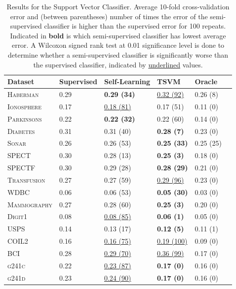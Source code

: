 \documentclass[twoside]{memoir}\usepackage[]{graphicx}\usepackage{xcolor}
\begin{document}
\begin{table}[t]
\caption{Results for the Support Vector Classifier. Average 10-fold cross-validation error and (between parentheses) number of times the error of the semi-supervised classifier is higher than the supervised error for 100 repeats. Indicated in \textbf{bold} is which semi-supervised classifier has lowest average error. A Wilcoxon signed rank test at 0.01 significance level is done to determine whether a semi-supervised classifier is significantly worse than the supervised classifier, indicated by \underline{underlined} values.} \label{table:cvresults-svm}
\centering
\begin{tabular}{llllll}
\toprule
Dataset & Supervised & Self-Learning & TSVM & Oracle \\ 
  \midrule
\textsc{Haberman} & 0.29 & \textbf{0.29 (34)} & \underline{0.32 (92)} & 0.26 (8) \\ 
  \textsc{Ionosphere} & 0.17 & \underline{0.18 (81)} & 0.17 (51) & 0.11 (0) \\ 
  \textsc{Parkinsons} & 0.22 & \textbf{0.22 (32)} & 0.22 (60) & 0.14 (0) \\ 
  \textsc{Diabetes} & 0.31 & 0.31 (40) & \textbf{0.28 (7)} & 0.23 (0) \\ 
  \textsc{Sonar} & 0.26 & 0.26 (53) & \textbf{0.25 (33)} & 0.25 (25) \\ 
  \textsc{SPECT} & 0.30 & 0.28 (13) & \textbf{0.25 (3)} & 0.18 (0) \\ 
  \textsc{SPECTF} & 0.30 & 0.29 (28) & \textbf{0.28 (29)} & 0.21 (0) \\ 
  \textsc{Transfusion} & 0.27 & 0.27 (59) & \underline{0.29 (96)} & 0.23 (0) \\ 
  \textsc{WDBC} & 0.06 & 0.06 (53) & \textbf{0.05 (30)} & 0.03 (0) \\ 
  \textsc{Mammography} & 0.27 & 0.28 (60) & \textbf{0.25 (3)} & 0.20 (0) \\ 
  \textsc{Digit1} & 0.08 & \underline{0.08 (85)} & \textbf{0.06 (1)} & 0.05 (0) \\ 
  \textsc{USPS} & 0.14 & 0.13 (17) & \textbf{0.12 (5)} & 0.11 (1) \\ 
  \textsc{COIL2} & 0.16 & \underline{0.16 (75)} & \underline{0.19 (100)} & 0.09 (0) \\ 
  \textsc{BCI} & 0.28 & \underline{0.29 (70)} & \underline{0.36 (99)} & 0.17 (0) \\ 
  \textsc{g241c} & 0.22 & \underline{0.23 (87)} & \textbf{0.17 (0)} & 0.16 (0) \\ 
  \textsc{g241d} & 0.23 & \underline{0.24 (90)} & \textbf{0.17 (0)} & 0.16 (0) \\ 
   \bottomrule


\end{tabular}
\end{table}
\end{document}
